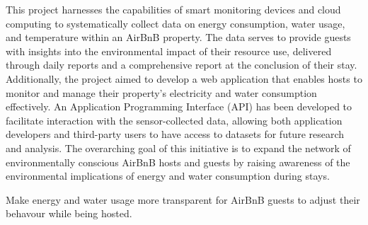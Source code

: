 %
%







This project harnesses the capabilities of smart monitoring devices and cloud computing to systematically 
collect data on energy consumption, water usage, and temperature within an 
AirBnB \cite{Airbnb2024a} property. The data serves to provide guests with 
insights into the environmental impact of their resource use, delivered through daily reports and a comprehensive report 
at the conclusion of their stay. Additionally, the project aimed to develop a web application that enables hosts to 
monitor and manage their property's electricity and water consumption effectively. An 
Application Programming Interface (API) \cite{Amazon2024a} has been 
developed to facilitate interaction with the sensor-collected data, allowing both application developers and third-party 
users to have access to datasets for future research and analysis. The overarching goal of this initiative is to expand 
the network of environmentally conscious AirBnB hosts and guests by raising awareness of the environmental implications 
of energy and water consumption during stays.

Make energy and water usage more transparent for AirBnB guests to adjust their behavour while being hosted.